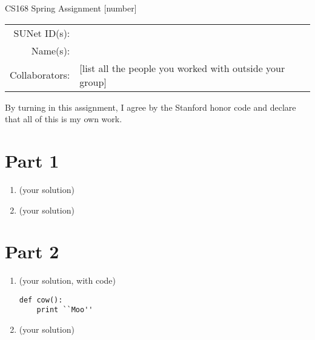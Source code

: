 \documentclass[12pt]{article}
\begin{document}
\begin{center}
{\Large CS168 Spring Assignment [number]}

\begin{tabular}{rl}
SUNet ID(s): & \\
Name(s): & \\
Collaborators: & [list all the people you worked with outside your group]
\end{tabular}
\end{center}

By turning in this assignment, I agree by the Stanford honor code and declare
that all of this is my own work.

\section*{Part 1}

\begin{enumerate}[label=(\alph*)]
  \item (your solution)
  \item (your solution)
\end{enumerate}

\section*{Part 2}

\begin{enumerate}[label=(\alph*)]
  \item (your solution, with code)
\begin{verbatim}
def cow():
    print ``Moo''
\end{verbatim}

  \item (your solution)
\end{enumerate}
\end{document}
